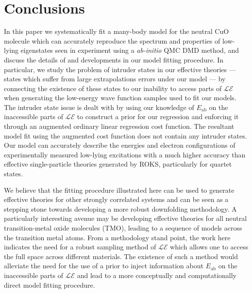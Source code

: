 \documentclass{article}
\begin{document}
\section{Conclusions}
In this paper we systematically fit a many-body model for the neutral CuO molecule which can accurately reproduce the spectrum and properties of low-lying eigenstates seen in experiment using a \textit{ab-initio} QMC DMD method, and discuss the details of and developments in our model fitting procedure.
In particular, we study the problem of intruder states in our effective theories --- states which suffer from large extrapolations errors under our model ---  by connecting the existence of these states to our inability to access parts of $\mathcal{LE}$ when generating the low-energy wave function samples used to fit our models.
The intruder state issue is dealt with by using our knowledge of $E_\text{ab}$ on the inaccessible parts of $\mathcal{LE}$ to construct a prior for our regression and enforcing it through an augmented ordinary linear regression cost function.
The resultant model fit using the augmented cost function does not contain any intruder states.
Our model can accurately describe the energies and electron configurations of experimentally measured low-lying excitations with a much higher accuracy than effective single-particle theories generated by ROKS, particularly for quartet states.

We believe that the fitting procedure illustrated here can be used to generate effective theories for other strongly correlated systems and can be seen as a stepping stone towards developing a more robust downfolding methodology. 
A particularly interesting avenue may be developing effective theories for all neutral transition-metal oxide molecules (TMO), leading to a sequence of models across the transition metal atoms. 
From a methodology stand point, the work here indicates the need for a robust sampling method of $\mathcal{LE}$ which allows one to access the full space across different materials.
The existence of such a method would alleviate the need for the use of a prior to inject information about $E_\text{ab}$ on the inaccessible parts of $\mathcal{LE}$ and lead to a more conceptually and computationally direct model fitting procedure. 
\end{document}
